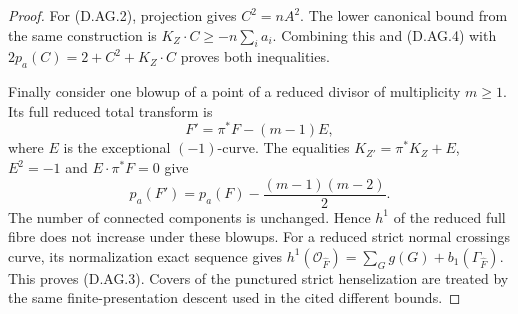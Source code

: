 \begin{proof}
For (D.AG.2), projection gives $C^2=nA^2$. The lower canonical
bound from the same construction is
$K_Z\cdot C\ge-n\sum_i a_i$. Combining this and (D.AG.4) with
$2p_a(C)=2+C^2+K_Z\cdot C$ proves both inequalities.

Finally consider one blowup of a point of a reduced divisor of
multiplicity $m\ge1$. Its full reduced total transform is
\[
                 F'=\pi^*F-(m-1)E,
\]
where $E$ is the exceptional $(-1)$-curve. The equalities
$K_{Z'}=\pi^*K_Z+E$, $E^2=-1$ and
$E\cdot\pi^*F=0$ give
\[
             p_a(F')=p_a(F)-\frac{(m-1)(m-2)}2.
\]
The number of connected components is unchanged. Hence $h^1$
of the reduced full fibre does not increase under these blowups.
For a reduced strict normal crossings curve, its normalization
exact sequence gives
$h^1(\mathcal O_{\widehat F})=\sum_G g(G)+b_1(\Gamma_{\widehat F})$.
This proves (D.AG.3). Covers of the punctured strict henselization
are treated by the same finite-presentation descent used in the
cited different bounds.
\end{proof}

